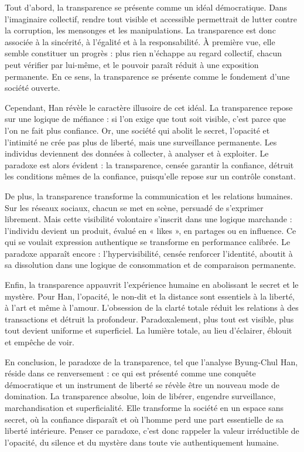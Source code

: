 \documentclass[12pt]{article}
\begin{document}
Tout d'abord, la transparence se présente comme un idéal démocratique. Dans l'imaginaire collectif, rendre tout visible et accessible permettrait de lutter contre la corruption, les mensonges et les manipulations. La transparence est donc associée à la sincérité, à l'égalité et à la responsabilité. À première vue, elle semble constituer un progrès : plus rien n'échappe au regard collectif, chacun peut vérifier par lui-même, et le pouvoir paraît réduit à une exposition permanente. En ce sens, la transparence se présente comme le fondement d'une société ouverte.

Cependant, Han révèle le caractère illusoire de cet idéal. La transparence repose sur une logique de méfiance : si l'on exige que tout soit visible, c'est parce que l'on ne fait plus confiance. Or, une société qui abolit le secret, l'opacité et l'intimité ne crée pas plus de liberté, mais une surveillance permanente. Les individus deviennent des données à collecter, à analyser et à exploiter. Le paradoxe est alors évident : la transparence, censée garantir la confiance, détruit les conditions mêmes de la confiance, puisqu'elle repose sur un contrôle constant.

De plus, la transparence transforme la communication et les relations humaines. Sur les réseaux sociaux, chacun se met en scène, persuadé de s'exprimer librement. Mais cette visibilité volontaire s'inscrit dans une logique marchande : l'individu devient un produit, évalué en « likes », en partages ou en influence. Ce qui se voulait expression authentique se transforme en performance calibrée. Le paradoxe apparaît encore : l'hypervisibilité, censée renforcer l'identité, aboutit à sa dissolution dans une logique de consommation et de comparaison permanente.

Enfin, la transparence appauvrit l'expérience humaine en abolissant le secret et le mystère. Pour Han, l'opacité, le non-dit et la distance sont essentiels à la liberté, à l'art et même à l'amour. L'obsession de la clarté totale réduit les relations à des transactions et détruit la profondeur. Paradoxalement, plus tout est visible, plus tout devient uniforme et superficiel. La lumière totale, au lieu d'éclairer, éblouit et empêche de voir.

En conclusion, le paradoxe de la transparence, tel que l'analyse Byung-Chul Han, réside dans ce renversement : ce qui est présenté comme une conquête démocratique et un instrument de liberté se révèle être un nouveau mode de domination. La transparence absolue, loin de libérer, engendre surveillance, marchandisation et superficialité. Elle transforme la société en un espace sans secret, où la confiance disparaît et où l'homme perd une part essentielle de sa liberté intérieure. Penser ce paradoxe, c'est donc rappeler la valeur irréductible de l'opacité, du silence et du mystère dans toute vie authentiquement humaine.
\end{document}
